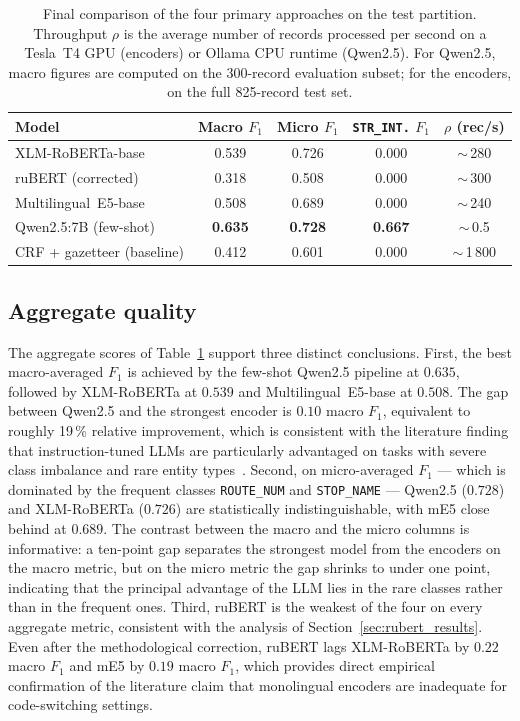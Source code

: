 \begin{table}[H]
\centering
\caption{Final comparison of the four primary approaches on the test partition. Throughput $\rho$ is the average number of records processed per second on a Tesla~T4 GPU (encoders) or Ollama CPU runtime (Qwen2.5). For Qwen2.5, macro figures are computed on the 300-record evaluation subset; for the encoders, on the full 825-record test set.}
\label{tab:final}
\renewcommand{\arraystretch}{1.3}
\begin{tabular}{lcccc}
\toprule
\textbf{Model} & \textbf{Macro $F_1$} & \textbf{Micro $F_1$} & \textbf{\texttt{STR\_INT.} $F_1$} & \textbf{$\rho$ (rec/s)} \\
\midrule
XLM-RoBERTa-base       & 0.539 & 0.726 & 0.000 & $\sim$\,280 \\
ruBERT (corrected)     & 0.318 & 0.508 & 0.000 & $\sim$\,300 \\
Multilingual~E5-base   & 0.508 & 0.689 & 0.000 & $\sim$\,240 \\
Qwen2.5:7B (few-shot)  & \textbf{0.635} & \textbf{0.728} & \textbf{0.667} & $\sim$\,0.5 \\
\midrule
CRF + gazetteer (baseline) & 0.412 & 0.601 & 0.000 & $\sim$\,1\,800 \\
\bottomrule
\end{tabular}
\end{table}

\subsection{Aggregate quality}
\label{sec:agg_quality}

The aggregate scores of Table~\ref{tab:final} support three distinct conclusions. First, the best macro-averaged $F_1$ is achieved by the few-shot Qwen2.5 pipeline at $0.635$, followed by XLM-RoBERTa at $0.539$ and Multilingual~E5-base at $0.508$. The gap between Qwen2.5 and the strongest encoder is $0.10$ macro $F_1$, equivalent to roughly 19\,\% relative improvement, which is consistent with the literature finding that instruction-tuned LLMs are particularly advantaged on tasks with severe class imbalance and rare entity types~\cite{keraghel2024survey,yang2024qwen}. Second, on micro-averaged $F_1$ --- which is dominated by the frequent classes \texttt{ROUTE\_NUM} and \texttt{STOP\_NAME} --- Qwen2.5 ($0.728$) and XLM-RoBERTa ($0.726$) are statistically indistinguishable, with mE5 close behind at $0.689$. The contrast between the macro and the micro columns is informative: a ten-point gap separates the strongest model from the encoders on the macro metric, but on the micro metric the gap shrinks to under one point, indicating that the principal advantage of the LLM lies in the rare classes rather than in the frequent ones. Third, ruBERT is the weakest of the four on every aggregate metric, consistent with the analysis of Section~\ref{sec:rubert_results}. Even after the methodological correction, ruBERT lags XLM-RoBERTa by $0.22$ macro $F_1$ and mE5 by $0.19$ macro $F_1$, which provides direct empirical confirmation of the literature claim that monolingual encoders are inadequate for code-switching settings.

